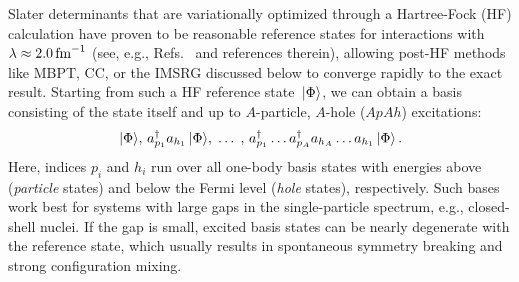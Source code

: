 {Slater determinants that are variationally optimized through a Hartree-Fock 
(HF) calculation have proven to be reasonable reference states for interactions 
with $\lambda\approx2.0\,\text{fm}^{-1}$ (see, e.g., Refs.~\cite{Bogner:2010pq,Roth:2010vp,Barrett:2013oq,Hagen:2014ve,Hergert:2016jk,Tichai:2016vl} and references therein), allowing post-HF methods like MBPT, 
CC, or the IMSRG discussed below to converge rapidly to the exact result. 
Starting from such a HF reference state $\,|{\Phi}\rangle$, we can obtain 
a basis consisting of the state itself and up to $A$-particle, $A$-hole ($ApAh$) 
excitations:
\begin{equation}
  \,|{\Phi}\rangle,\,a^\dag_{p_1}a_{h_1}\,|{\Phi}\rangle,\;\ldots\;,\,a^\dag_{p_1}\ldots a^\dag_{p_A}a_{h_A}\ldots a_{h_1}\,|{\Phi}\rangle\,.
\end{equation}
Here, indices $p_i$ and $h_i$ run over all one-body basis states with energies above 
(\emph{particle} states) and below the Fermi level (\emph{hole} states), respectively.
Such bases work best for systems with large gaps in the single-particle 
spectrum, e.g., closed-shell nuclei. If the gap is small, excited basis 
states can be nearly degenerate with the reference state, which usually 
results in spontaneous symmetry breaking and strong configuration mixing.

}
